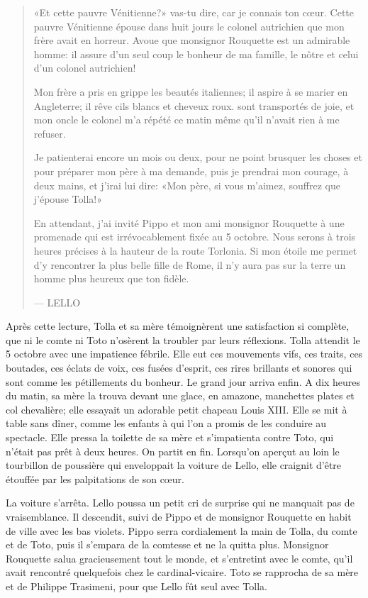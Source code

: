 \begin{quote}
«Et cette pauvre Vénitienne?» vas-tu dire, car je connais ton cœur.
Cette pauvre Vénitienne épouse dans huit jours le colonel autrichien que
mon frère avait en horreur. Avoue que monsignor Rouquette est un
admirable homme: il assure d'un seul coup le bonheur de ma famille, le
nôtre et celui d'un colonel autrichien!

Mon frère a pris en grippe les beautés italiennes; il aspire à se marier
en Angleterre; il rêve cils blancs et cheveux roux. sont transportés de
joie, et mon oncle le colonel m'a répété ce matin même qu'il n'avait
rien à me refuser.

Je patienterai encore un mois ou deux, pour ne point brusquer les choses
et pour préparer mon père à ma demande, puis je prendrai mon courage, à
deux mains, et j'irai lui dire: «Mon père, si vous m'aimez, souffrez que
j'épouse Tolla!»

En attendant, j'ai invité Pippo et mon ami monsignor Rouquette à une
promenade qui est irrévocablement fixée au 5 octobre. Nous serons à
trois heures précises à la hauteur de la route Torlonia. Si mon étoile
me permet d'y rencontrer la plus belle fille de Rome, il n'y aura pas
sur la terre un homme plus heureux que ton fidèle.

--- LELLO
\end{quote}

Après cette lecture, Tolla et sa mère témoignèrent une satisfaction si
complète, que ni le comte ni Toto n'osèrent la troubler par leurs
réflexions. Tolla attendit le 5 octobre avec une impatience fébrile.
Elle eut ces mouvements vifs, ces traits, ces boutades, ces éclats de
voix, ces fusées d'esprit, ces rires brillants et sonores qui sont comme
les pétillements du bonheur. Le grand jour arriva enfin. A dix heures du
matin, sa mère la trouva devant une glace, en amazone, manchettes plates
et col chevalière; elle essayait un adorable petit chapeau Louis XIII.
Elle se mit à table sans dîner, comme les enfants à qui l'on a promis de
les conduire au spectacle. Elle pressa la toilette de sa mère et
s'impatienta contre Toto, qui n'était pas prêt à deux heures. On partit
en fin. Lorsqu'on aperçut au loin le tourbillon de poussière qui
enveloppait la voiture de Lello, elle craignit d'être étouffée par les
palpitations de son cœur.

La voiture s'arrêta. Lello poussa un petit cri de surprise qui ne
manquait pas de vraisemblance. Il descendit, suivi de Pippo et de
monsignor Rouquette en habit de ville avec les bas violets. Pippo serra
cordialement la main de Tolla, du comte et de Toto, puis il s'empara de
la comtesse et ne la quitta plus. Monsignor Rouquette salua
gracieusement tout le monde, et s'entretint avec le comte, qu'il avait
rencontré quelquefois chez le cardinal-vicaire. Toto se rapprocha de sa
mère et de Philippe Trasimeni, pour que Lello fût seul avec Tolla.

